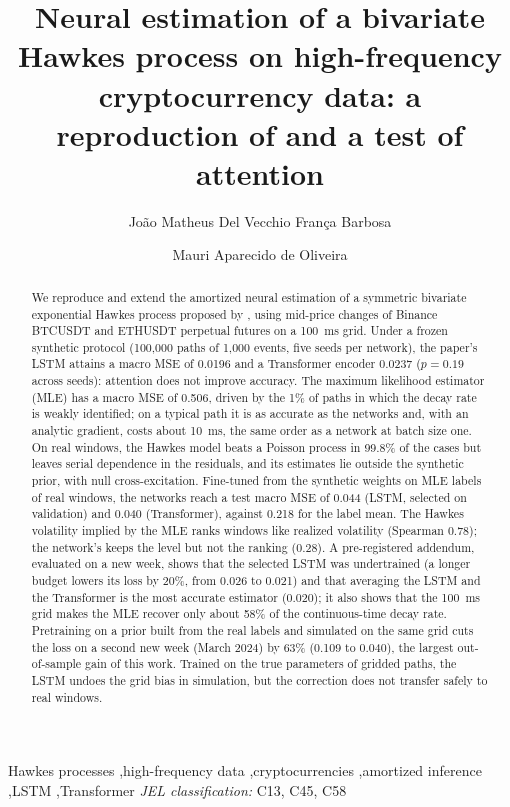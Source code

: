 \documentclass[preprint,12pt,authoryear]{elsarticle}
\begin{document}
\begin{frontmatter}

\title{Neural estimation of a bivariate Hawkes process on high-frequency
cryptocurrency data: a reproduction of \texorpdfstring{\citet{lee2023}}{Lee (2023)} and a test of attention}

\author{Jo\~{a}o Matheus Del Vecchio Fran\c{c}a Barbosa}
\author{Mauri Aparecido de Oliveira}
\address{Instituto Tecnol\'{o}gico de Aeron\'{a}utica (ITA), S\~{a}o Jos\'{e} dos
Campos, SP, Brazil}

\begin{abstract}
We reproduce and extend the amortized neural estimation of a symmetric bivariate
exponential Hawkes process proposed by \citet{lee2023}, using mid-price changes of Binance
BTCUSDT and ETHUSDT perpetual futures on a 100~ms grid. Under a frozen synthetic protocol
(100,000 paths of 1,000 events, five seeds per network), the paper's LSTM attains a macro
MSE of 0.0196 and a Transformer encoder 0.0237 ($p=0.19$ across seeds): attention does not
improve accuracy. The maximum likelihood estimator (MLE) has a macro MSE of 0.506, driven by
the 1\% of paths in which the decay rate is weakly identified; on a typical path it is as
accurate as the networks and, with an analytic gradient, costs about 10~ms, the same order
as a network at batch size one. On real windows, the Hawkes model beats a Poisson process in
99.8\% of the cases but leaves serial dependence in the residuals, and its estimates lie
outside the synthetic prior, with null cross-excitation. Fine-tuned from the synthetic
weights on MLE labels of real windows, the networks reach a test macro MSE of 0.044 (LSTM,
selected on validation) and 0.040 (Transformer), against 0.218 for the label mean. The
Hawkes volatility implied by the MLE ranks windows like realized volatility (Spearman 0.78);
the network's keeps the level but not the ranking (0.28). A pre-registered addendum, evaluated
on a new week, shows that the selected LSTM was undertrained (a longer budget lowers its loss
by 20\%, from 0.026 to 0.021) and that averaging the LSTM and the Transformer is the most
accurate estimator (0.020); it also shows that the 100~ms grid makes the MLE recover only
about 58\% of the continuous-time decay rate. Pretraining on a prior built from the real
labels and simulated on the same grid cuts the loss on a second new week (March 2024) by 63\%
(0.109 to 0.040), the largest out-of-sample gain of this work. Trained on the true parameters
of gridded paths, the LSTM undoes the grid bias in simulation, but the correction does not
transfer safely to real windows.
\end{abstract}

\begin{keyword}
Hawkes processes \sep high-frequency data \sep cryptocurrencies \sep amortized inference
\sep LSTM \sep Transformer\break
\textit{JEL classification:} C13, C45, C58
\end{keyword}

\end{frontmatter}
\end{document}
